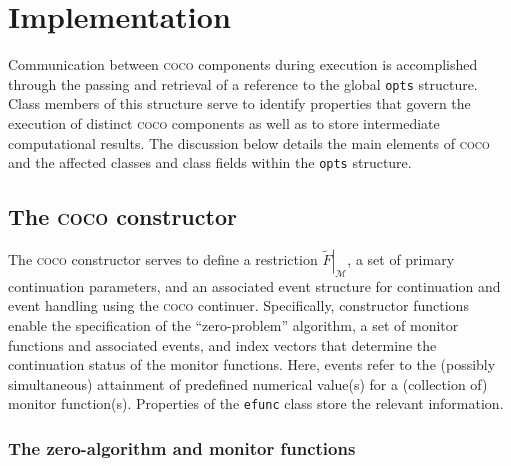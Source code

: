 \documentclass{article}
\begin{document}
\section{Implementation}

Communication between \textsc{coco} components during execution is
accomplished through the passing and retrieval of a reference to the global 
\texttt{opts} structure. Class members of this structure serve to identify
properties that govern the execution of distinct \textsc{coco} components as
well as to store intermediate computational results. The discussion below
details the main elements of \textsc{coco} and the affected classes and
class fields within the \texttt{opts} structure.

\subsection{The \textsc{coco} constructor}

The \textsc{coco} constructor serves to define a restriction $\left. \tilde{F%
}\right| _{\mathcal{M}}$, a set of primary continuation parameters, and an
associated event structure for continuation and event handling using the 
\textsc{coco} continuer. Specifically, constructor functions enable the
specification of the ``zero-problem'' algorithm, a set of monitor functions
and associated events, and index vectors that determine the continuation
status of the monitor functions. Here, events refer to the (possibly
simultaneous) attainment of predefined numerical value(s) for a (collection
of) monitor function(s). Properties of the \texttt{efunc} class store the
relevant information.

\subsubsection{The zero-algorithm and monitor functions}
\end{document}
